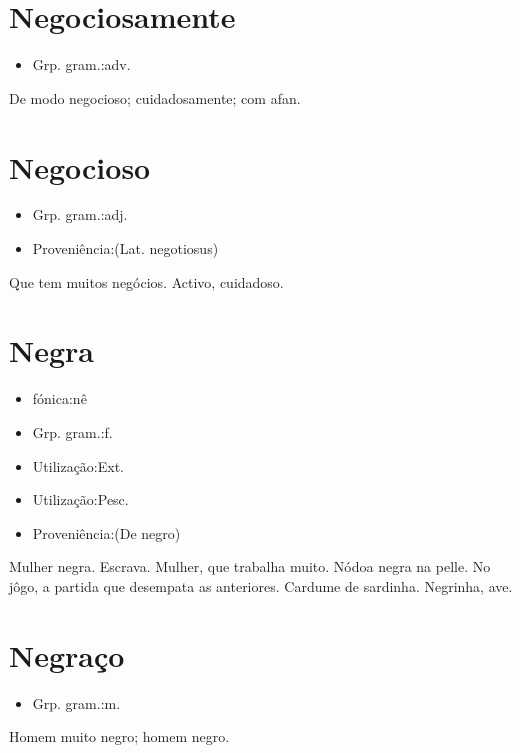 \section{Negociosamente}
\begin{itemize}
\item {Grp. gram.:adv.}
\end{itemize}
De modo negocioso; cuidadosamente; com afan.
\section{Negocioso}
\begin{itemize}
\item {Grp. gram.:adj.}
\end{itemize}
\begin{itemize}
\item {Proveniência:(Lat. \textunderscore negotiosus\textunderscore )}
\end{itemize}
Que tem muitos negócios.
Activo, cuidadoso.
\section{Negra}
\begin{itemize}
\item {fónica:nê}
\end{itemize}
\begin{itemize}
\item {Grp. gram.:f.}
\end{itemize}
\begin{itemize}
\item {Utilização:Ext.}
\end{itemize}
\begin{itemize}
\item {Utilização:Pesc.}
\end{itemize}
\begin{itemize}
\item {Proveniência:(De \textunderscore negro\textunderscore )}
\end{itemize}
Mulher negra.
Escrava.
Mulher, que trabalha muito.
Nódoa negra na pelle.
No jôgo, a partida que desempata as anteriores.
Cardume de sardinha.
Negrinha, ave.
\section{Negraço}
\begin{itemize}
\item {Grp. gram.:m.}
\end{itemize}
Homem muito negro; homem negro.
